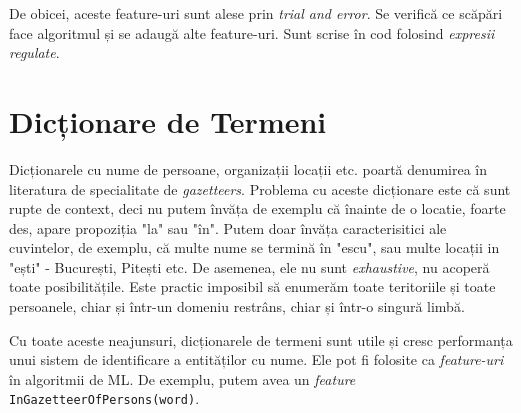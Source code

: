 De obicei, aceste feature-uri sunt alese prin \textit{trial and error}. Se verifică ce scăpări face algoritmul și se adaugă alte feature-uri. Sunt scrise în cod folosind \textit{expresii regulate}.

\section{Dicționare de Termeni}
Dicționarele cu nume de persoane, organizații locații etc. poartă denumirea în literatura de specialitate de \textit{gazetteers}. Problema cu aceste dicționare este că sunt rupte de context, deci nu putem învăța de exemplu că înainte de o locatie, foarte des, apare propoziția "la" sau "în". Putem doar învăța caracterisitici ale cuvintelor, de exemplu, că multe nume se termină în "escu", sau multe locații in "ești" - București, Pitești etc. De asemenea, ele nu sunt \textit{exhaustive}, nu acoperă toate posibilitățile. Este practic imposibil să enumerăm toate teritoriile și toate persoanele, chiar și într-un domeniu restrâns, chiar și într-o singură limbă.

Cu toate aceste neajunsuri, dicționarele de termeni sunt utile și cresc performanța unui sistem de identificare a entităților cu nume. Ele pot fi folosite ca \textit{feature-uri} în algoritmii de ML. De exemplu, putem avea un \textit{feature} \texttt{InGazetteerOfPersons(word)}.








